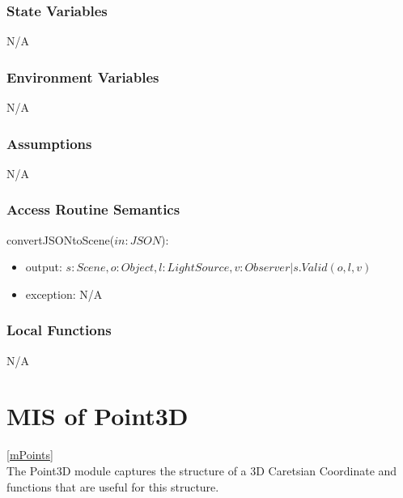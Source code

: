 \documentclass[12pt, titlepage]{article}
\begin{document}
\subsubsection{State Variables}
N/A

\subsubsection{Environment Variables}
N/A

\subsubsection{Assumptions}
N/A

\subsubsection{Access Routine Semantics}
\noindent convertJSONtoScene($in: JSON$):
\begin{itemize}
	\item output: $s : Scene, o : Object, l : LightSource , v: Observer | 
	s.Valid(o,l,v)$ %
	\item exception: N/A
\end{itemize}

\subsubsection{Local Functions}
N/A

\newpage


\section{MIS of Point3D} \ref{mPoints} \\
The Point3D module captures the structure of a 3D Caretsian Coordinate and 
functions that are useful for this structure.
\end{document}

